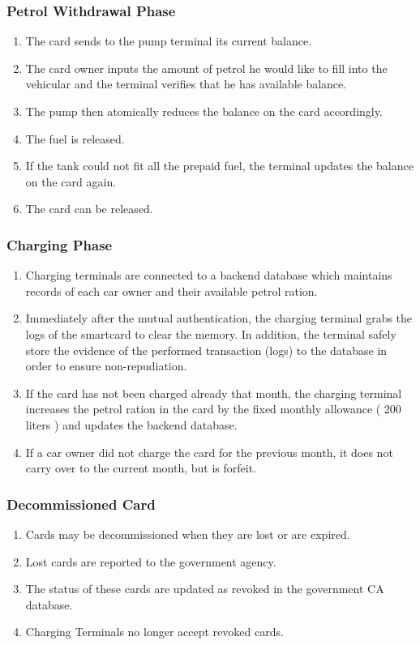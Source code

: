 \subsubsection{Petrol Withdrawal Phase}

\begin{enumerate}
  \item The card sends to the pump terminal its current balance.
  \item The card owner inputs the amount of petrol he would like to fill into the vehicular and the terminal verifies that he has available balance.
  \item The pump then atomically reduces the balance on the card accordingly.
  \item The fuel is released.
  \item If the tank could not fit all the prepaid fuel, the terminal updates the balance on the card again.
  \item The card can be released.
\end{enumerate}


\subsubsection{Charging Phase}

\begin{enumerate}
  \item Charging terminals are connected to a backend database which maintains records of each car owner and their available petrol ration.
  \item Immediately after the mutual authentication, the charging terminal grabs the logs of the smartcard to clear the memory.  In addition, the terminal safely store the evidence of the performed transaction (logs) to the database in order to ensure non-repudiation.
  \item If the card has not been charged already that month, the charging terminal increases the petrol ration in the card by the fixed monthly allowance ( 200 liters ) and updates the backend database. 
  \item If a car owner did not charge the card for the previous month, it does not carry over to the current month, but is forfeit.
\end{enumerate}


\subsubsection{Decommissioned Card}

\begin{enumerate}
  \item Cards may be decommissioned when they are lost or are expired.
  \item Lost cards are reported to the government agency.
  \item The status of these cards are updated as revoked in the government CA database.
  \item Charging Terminals no longer accept revoked cards.
\end{enumerate}
